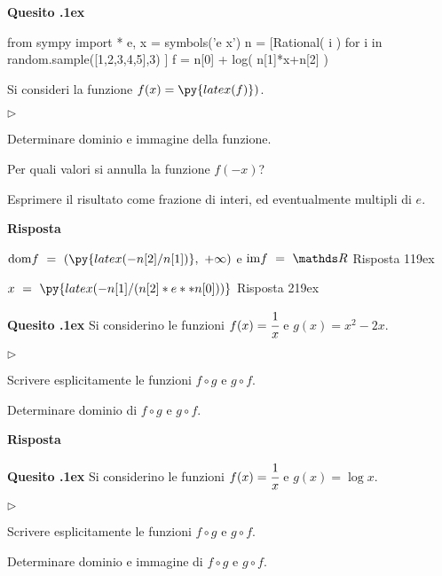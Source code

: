 \documentclass[11pt,twoside,a4paper]{article}
\newcommand{\mylabel}[1]{#1\hfill}
\renewenvironment{itemize}
  {\begin{list}{$\triangleright$}{%
   \setlength{\parskip}{0mm}
   \setlength{\topsep}{.4\baselineskip}
   \setlength{\rightmargin}{0mm}
   \setlength{\listparindent}{0mm}
   \setlength{\itemindent}{0mm}
   \setlength{\labelwidth}{2ex}
   \setlength{\itemsep}{.4\baselineskip}
   \setlength{\parsep}{0mm}
   \setlength{\partopsep}{0mm}
   \setlength{\labelsep}{1ex}
   \setlength{\leftmargin}{\labelwidth+\labelsep}
   \let\makelabel\mylabel}}{%
   \end{list}\vspace*{-1.3mm}}
\newcounter{quesito}
\newenvironment{question}{\bigskip\addtocounter{quesito}{1}\bigskip\bigskip\par\textbf{Quesito \thequesito.\kern1ex}}{\vspace{\parskip}}
\newenvironment{answer}{\par\textbf{Risposta\quad}}{\vspace{\parskip}}
\begin{document}
\begin{question}
\def\RR{{\mathds R}}
\def\dom{{\rm dom}}
\def\range{{\rm im}}
\begin{pycode}
from sympy import *
e, x = symbols('e x')
n = [Rational( i ) for i in random.sample([1,2,3,4,5],3) ]
f = n[0] + log( n[1]*x+n[2] )
\end{pycode}
Si consideri la funzione $f(x) = \py{ latex(f) } )$.
\begin{itemize}
\item[1.] Determinare dominio e immagine della funzione. 
\item[2.] Per quali valori si annulla la funzione $f(-x)$?
\end{itemize}
Esprimere il risultato come frazione di interi, ed eventualmente multipli di $e$.
\begin{answer}

{\color{blue}
$\displaystyle\dom f\ =\ \left(\py{latex(-n[2]/n[1])},\ +\infty\right)$
\quad e\quad
$\range f\ =\ \RR$
\hfill Risposta 1\kern19ex}

{\color{blue}
$\displaystyle x\ =\ \py{latex(-n[1]/(n[2]*e**n[0]))}$
\hfill Risposta 2\kern19ex}

\end{answer}
\end{question}

\begin{question}
Si considerino le funzioni $f(x) = \cfrac{1}{x}$ e $g(x) = x^2 - 2x$.
\begin{itemize}
\item[1.] Scrivere esplicitamente le funzioni $f \circ g$ e $g \circ f$.
\item[2.] Determinare dominio di $f \circ g$ e $g \circ f$.
\end{itemize}
\begin{answer}

\end{answer}
\end{question}

\begin{question}
Si considerino le funzioni $f(x) = \cfrac{1}{x}$ e $g(x) = \log x$.
\begin{itemize}
\item[1.] Scrivere esplicitamente le funzioni $f \circ g$ e $g \circ f$.
\item[2.] Determinare dominio e immagine di $f \circ g$ e $g \circ f$.
\end{itemize}
\end{question}
\end{document}
